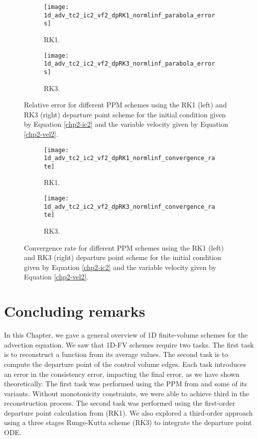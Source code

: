 \begin{figure}[!htb]
  \centering
  \begin{subfigure}{0.49\textwidth}
    \centering
		\texttt{[image: 1d\_adv\_tc2\_ic2\_vf2\_dpRK1\_normlinf\_parabola\_errors]}
		\caption{RK1.\label{chp2-sec-exp-adv6-error-rk1}}
  \end{subfigure}
  \begin{subfigure}{0.49\textwidth}
    \centering
			\texttt{[image: 1d\_adv\_tc2\_ic2\_vf2\_dpRK3\_normlinf\_parabola\_errors]}
		\caption{RK3.\label{chp2-sec-exp-adv6-rl3}}
  \end{subfigure}
	\caption{ Relative error for different PPM schemes using the RK1 (left) and RK3 (right)
	departure point scheme for the initial condition given by Equation
	\eqref{chp2-ic2} and the variable 
	velocity given by Equation \eqref{chp2-vel2}.\label{chp2-sec-exp-adv6-2}}
\end{figure}

\begin{figure}[!htb]
	\centering
	\begin{subfigure}{0.49\textwidth}
		\centering
		\texttt{[image: 1d\_adv\_tc2\_ic2\_vf2\_dpRK1\_normlinf\_convergence\_rate]}
		\caption{RK1.\label{chp2-sec-exp-adv6-cr-rk1}}
	\end{subfigure}
	\begin{subfigure}{0.49\textwidth}
		\centering
		\texttt{[image: 1d\_adv\_tc2\_ic2\_vf2\_dpRK3\_normlinf\_convergence\_rate]}
		\caption{RK3.\label{chp2-sec-exp-adv6-cf-rk3}}
	\end{subfigure}
	\caption{ Convergence rate for different PPM schemes using the RK1 (left) and RK3 (right)
	departure point scheme for the initial condition given by Equation
	\eqref{chp2-ic2} and the variable 
	velocity given by Equation \eqref{chp2-vel2}.\label{chp2-sec-exp-adv6-3}}
\end{figure}

\section{Concluding remarks}
\label{chp2-sec-conclusion}
In this Chapter, we gave a general overview of 1D finite-volume schemes for the
advection equation. We saw that 1D-FV schemes require two tasks. 
The first task is to reconstruct a function from its average values. 
The second task is to compute the departure point of the control volume edges.
Each task introduces an error in the consistency error, impacting the final error, 
as we have shown theoretically.
The first task was performed using the PPM from \citet{colella:1984} 
and some of its variants. Without monotonicity constraints, we were able to 
achieve third in the reconstruction process.
The second task was performed using the first-order departure point calculation from
\citet{colella:1984} (RK1). We also explored a third-order approach using a three stages
Runge-Kutta scheme (RK3) to integrate the departure point ODE.

